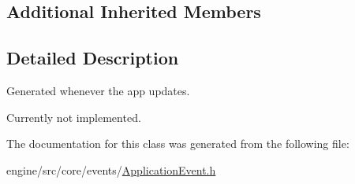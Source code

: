 \subsection*{Additional Inherited Members}


\subsection{Detailed Description}
Generated whenever the app updates. 

Currently not implemented. 

The documentation for this class was generated from the following file\+:\begin{DoxyCompactItemize}
\item 
engine/src/core/events/\hyperlink{ApplicationEvent_8h}{Application\+Event.\+h}\end{DoxyCompactItemize}
